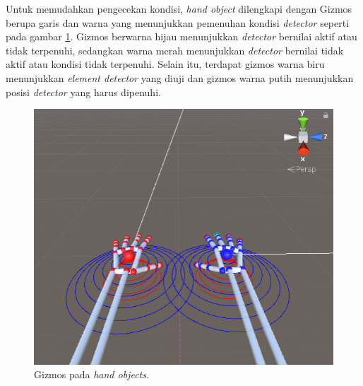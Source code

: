 		Untuk memudahkan pengecekan kondisi, \textit{hand object} dilengkapi dengan Gizmos berupa garis dan warna yang menunjukkan pemenuhan kondisi \textit{detector} seperti pada gambar \ref{fig:gizmos}. Gizmos berwarna hijau menunjukkan \textit{detector} bernilai aktif atau tidak terpenuhi, sedangkan warna merah menunjukkan \textit{detector} bernilai tidak aktif atau kondisi tidak terpenuhi. Selain itu, terdapat gizmos warna biru menunjukkan \textit{element detector} yang diuji dan gizmos warna putih menunjukkan posisi \textit{detector} yang harus dipenuhi. 
		\begin{figure} [H]
			\includegraphics[scale=0.3]{img/bab3/gizmos.png}
			\caption{Gizmos pada \textit{hand objects}.}
			\label{fig:gizmos}
		\end{figure}
		\vspace{-2ex}	
	

